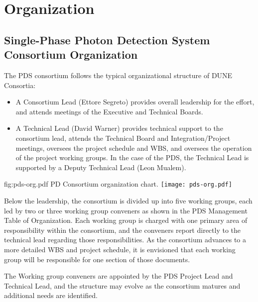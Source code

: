 \section{Organization}
\label{sec:fdsp-pd-org}

\subsection{Single-Phase Photon Detection System Consortium Organization}
\label{sec:fdsp-pd-org-consortium}


The PDS consortium follows the typical organizational structure of DUNE Consortia:
\begin{itemize}
\item A Consortium Lead (Ettore Segreto) provides overall leadership for the effort, and attends meetings of the Executive and Technical Boards.
\item A Technical Lead (David Warner) provides technical support to the consortium lead, attends the Technical Board and Integration/Project meetings, oversees the project schedule and WBS, and oversees the operation of the project working groups.  In the case of the PDS, the Technical Lead is supported by a Deputy Technical Lead (Leon Mualem).
\end{itemize}

\begin{dunefigure}{fig:pds-org.pdf}
{PD Consortium organization chart.}
 \texttt{[image: pds-org.pdf]}
\end{dunefigure}

Below the leadership, the consortium is divided up into five working groups, each led by two or three working group conveners as shown in the PDS Management Table of Organization.  Each working group is charged with one primary area of responsibility within the consortium, and the conveners report directly to the technical lead regarding those responsibilities.  As the consortium advances to a more detailed WBS and project schedule, it is envisioned that each working group will be responsible for one section of those documents.

The Working group conveners are appointed by the PDS Project Lead and Technical Lead, and the structure may evolve as the consortium matures and additional needs are identified. 

